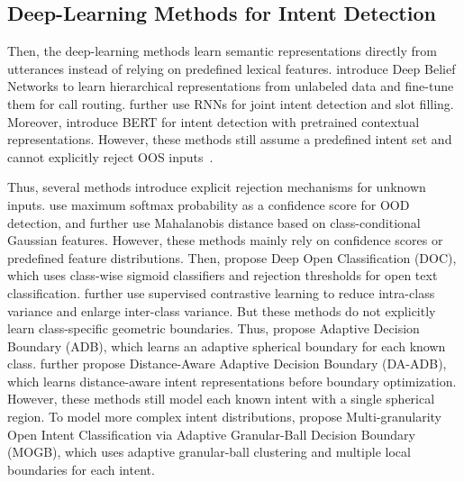 \documentclass[11pt]{article}
\begin{document}
\subsection{Deep-Learning Methods for Intent Detection}
Then, the deep-learning methods learn semantic representations directly from utterances instead of relying on predefined lexical features. \citet{sarikaya2011deep} introduce Deep Belief Networks to learn hierarchical representations from unlabeled data and fine-tune them for call routing. \citet{liu2016attention} further use RNNs for joint intent detection and slot filling. Moreover, \citet{chen2019bert} introduce BERT for intent detection with pretrained contextual representations. However, these methods still assume a predefined intent set and cannot explicitly reject OOS inputs~\citep{hendrycks2017baseline, larson2019evaluation}.

Thus, several methods introduce explicit rejection mechanisms for unknown inputs. \citet{hendrycks2017baseline} use maximum softmax probability as a confidence score for OOD detection, and \citet{lee2018simple} further use Mahalanobis distance based on class-conditional Gaussian features. However, these methods mainly rely on confidence scores or predefined feature distributions. Then, \citet{shu2017doc} propose Deep Open Classification (DOC), which uses class-wise sigmoid classifiers and rejection thresholds for open text classification. \citet{zeng2021modeling} further use supervised contrastive learning to reduce intra-class variance and enlarge inter-class variance. But these methods do not explicitly learn class-specific geometric boundaries. Thus, \citet{zhang2021adaptive} propose Adaptive Decision Boundary (ADB), which learns an adaptive spherical boundary for each known class. \citet{zhang2023learning} further propose Distance-Aware Adaptive Decision Boundary (DA-ADB), which learns distance-aware intent representations before boundary optimization. However, these methods still model each known intent with a single spherical region. To model more complex intent distributions, \citet{li2025multi} propose Multi-granularity Open Intent Classification via Adaptive Granular-Ball Decision Boundary (MOGB), which uses adaptive granular-ball clustering and multiple local boundaries for each intent.
\end{document}
